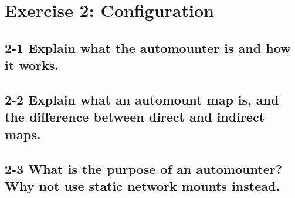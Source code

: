 \section{Exercise 2: Configuration}
\subsection{2-1 Explain what the automounter is and how it works.}

\subsection{2-2 Explain what an automount map is, and the difference between direct and indirect maps.}

\subsection{2-3 What is the purpose of an automounter? Why not use static network mounts instead.}



